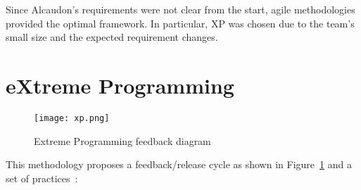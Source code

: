 Since Alcaudon's requirements were not clear from the start, agile methodologies
provided the optimal framework. In particular, \acf{XP} was chosen
due to the team's small size and the expected requirement changes.

\section{eXtreme Programming}

\begin{figure}
  \centering
  \texttt{[image: xp.png]}
  \caption{Extreme Programming feedback diagram~\cite{xp}}
  \label{fig:xp}
\end{figure}

This methodology proposes a feedback/release cycle as shown in Figure~\ref{fig:xp} and a set of
practices~\cite{xp}:

